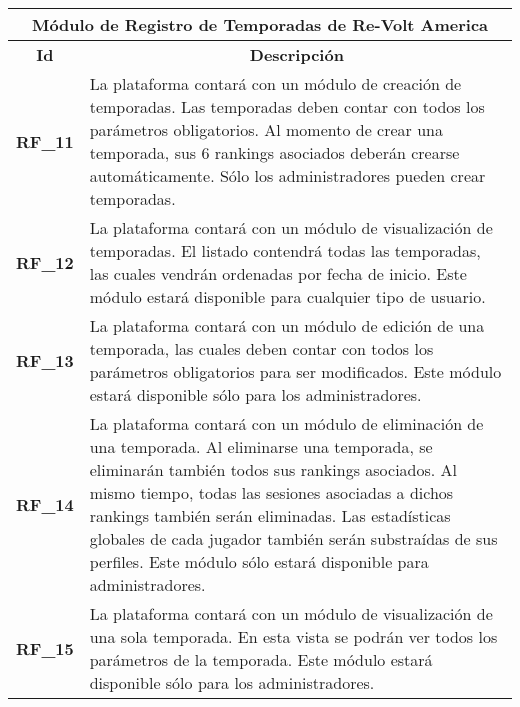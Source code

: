 \begin{center}
	\begin{tabular}{ | l | p{15cm} |}
		\hline
		\multicolumn{2}{|c|}{\textbf{Módulo de Registro de Temporadas de Re-Volt America}} \\
		\hline
		\multicolumn{1}{|c|}{\textbf{Id}} & \multicolumn{1}{|c|}{\textbf{Descripción}} \\
		\hline
		{\textbf{RF\_11}} & La plataforma contará con un módulo de creación de temporadas. Las temporadas deben contar con todos los parámetros obligatorios. Al momento de crear una temporada, sus 6 rankings asociados deberán crearse automáticamente. Sólo los administradores pueden crear temporadas. \\ \hline
		
		{\textbf{RF\_12}} & La plataforma contará con un módulo de visualización de temporadas. El listado contendrá todas las temporadas, las cuales vendrán ordenadas por fecha de inicio. Este módulo estará disponible para cualquier tipo de usuario. \\ \hline
		
		{\textbf{RF\_13}} & La plataforma contará con un módulo de edición de una temporada, las cuales deben contar con todos los parámetros obligatorios para ser modificados. Este módulo estará disponible sólo para los administradores. \\ \hline
		
		{\textbf{RF\_14}} & La plataforma contará con un módulo de eliminación de una temporada. Al eliminarse una temporada, se eliminarán también todos sus rankings asociados. Al mismo tiempo, todas las sesiones asociadas a dichos rankings también serán eliminadas. Las estadísticas globales de cada jugador también serán substraídas de sus perfiles. Este módulo sólo estará disponible para administradores. \\ \hline
		
		{\textbf{RF\_15}} & La plataforma contará con un módulo de visualización de una sola temporada. En esta vista se podrán ver todos los parámetros de la temporada. Este módulo estará disponible sólo para los administradores. \\ \hline
	\end{tabular}
\end{center}

